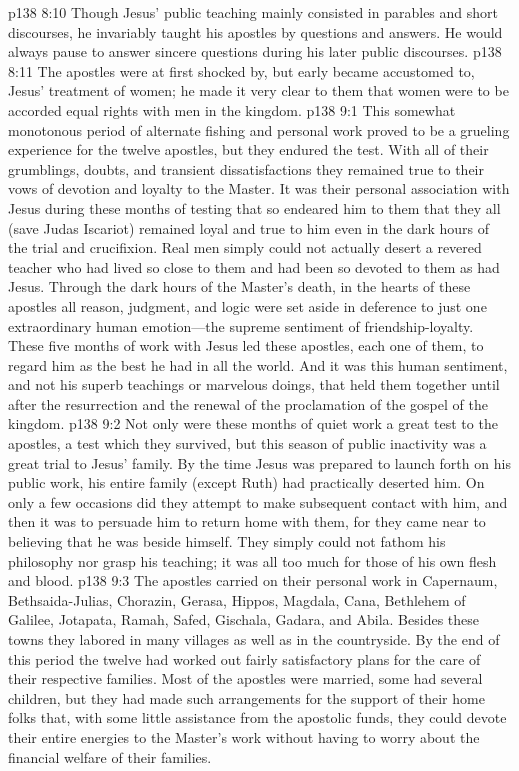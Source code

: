 \pc \vs p138 8:10 Though Jesus’ public teaching mainly consisted in parables and short discourses, he invariably taught his apostles by questions and answers. He would always pause to answer sincere questions during his later public discourses.
\vs p138 8:11 The apostles were at first shocked by, but early became accustomed to, Jesus’ treatment of women; he made it very clear to them that women were to be accorded equal rights with men in the kingdom.
%
\vs p138 9:1 This somewhat monotonous period of alternate fishing and personal work proved to be a grueling experience for the twelve apostles, but they endured the test. With all of their grumblings, doubts, and transient dissatisfactions they remained true to their vows of devotion and loyalty to the Master. It was their personal association with Jesus during these months of testing that so endeared him to them that they all (save Judas Iscariot) remained loyal and true to him even in the dark hours of the trial and crucifixion. Real men simply could not actually desert a revered teacher who had lived so close to them and had been so devoted to them as had Jesus. Through the dark hours of the Master’s death, in the hearts of these apostles all reason, judgment, and logic were set aside in deference to just one extraordinary human emotion---the supreme sentiment of friendship\hyp{}loyalty. These five months of work with Jesus led these apostles, each one of them, to regard him as the best  he had in all the world. And it was this human sentiment, and not his superb teachings or marvelous doings, that held them together until after the resurrection and the renewal of the proclamation of the gospel of the kingdom.
\vs p138 9:2 Not only were these months of quiet work a great test to the apostles, a test which they survived, but this season of public inactivity was a great trial to Jesus’ family. By the time Jesus was prepared to launch forth on his public work, his entire family (except Ruth) had practically deserted him. On only a few occasions did they attempt to make subsequent contact with him, and then it was to persuade him to return home with them, for they came near to believing that he was beside himself. They simply could not fathom his philosophy nor grasp his teaching; it was all too much for those of his own flesh and blood.
\pc \vs p138 9:3 The apostles carried on their personal work in Capernaum, Bethsaida\hyp{}Julias, Chorazin, Gerasa, Hippos, Magdala, Cana, Bethlehem of Galilee, Jotapata, Ramah, Safed, Gischala, Gadara, and Abila. Besides these towns they labored in many villages as well as in the countryside. By the end of this period the twelve had worked out fairly satisfactory plans for the care of their respective families. Most of the apostles were married, some had several children, but they had made such arrangements for the support of their home folks that, with some little assistance from the apostolic funds, they could devote their entire energies to the Master’s work without having to worry about the financial welfare of their families.
